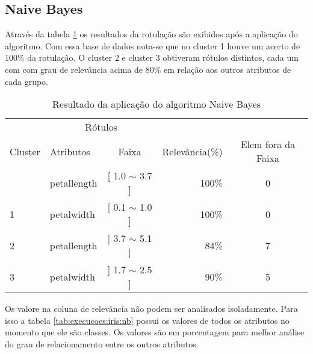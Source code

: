 \subsection{Naive Bayes} \label{cap:resultados:ssec:iris:nb}

Através da tabela \ref{tab:rot:iris:nb} os resultados da rotulação são exibidos após a aplicação do algoritmo. Com essa base de dados nota-se que no cluster 1 houve um acerto de 100\% da rotulação. O cluster 2 e cluster 3 obtiveram rótulos distintos, cada um com com grau de relevância acima de 80\% em relação aos outros atributos de cada grupo.

\begin{table}[!h]
\centering
\caption{Resultado da aplicação do algoritmo Naive Bayes}
\label{tab:rot:iris:nb}
\begin{tabular}{llcrc} \hline \hline
 
\multicolumn{1}{c}{\cellcolor[HTML]{FFFFFF}} & \multicolumn{2}{c}{Rótulos}                & \multicolumn{1}{r}{}               & \\ \cline{2-3}
Cluster                                      & Atributos      & \multicolumn{1}{c}{Faixa} & \multicolumn{1}{c}{Relevância(\%)} & Elem fora da Faixa\\ \hline \hline
                                             & petallength    & [ 1.0 $\sim$  3.7 ]       & 100\%                               & 0 \\  
\multirow{-2}{*}{1}                          & petalwidth     & [ 0.1 $\sim$  1.0 ]       & 100\%                               & 0 \\  \hline
2                                             & petallength    & ] 3.7 $\sim$  5.1 ]       & 84\%                               & 7\\ \hline
3                                            & petalwidth     & ] 1.7 $\sim$  2.5 ]       & 90\%                               & 5\\ \hline \hline
\end{tabular}
\end{table}

Os valore na coluna de relevância não podem ser analisados isoladamente. Para isso  a tabela \ref{tab:execucoes:iris:nb} possui os valores de todos os atributos no momento que ele são classes. Os valores são em porcentagem para melhor análise do grau de relacionamento entre os outros atributos.

